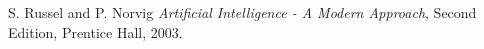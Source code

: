 \documentclass[cover]{isas-seminar}
\begin{document}
%



\begin{thebibliography}{99}

 {\sc S. Russel and P. Norvig }  \textit{Artificial Intelligence - A Modern Approach},
Second Edition, Prentice Hall, 2003.

\end{thebibliography}
\end{document}

